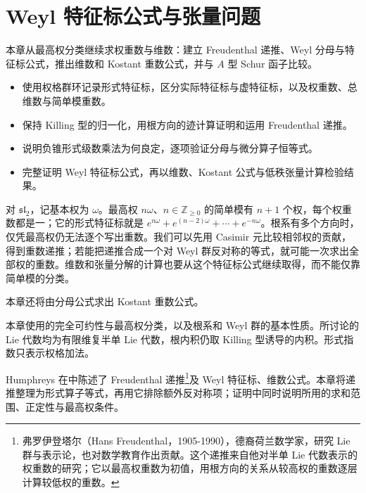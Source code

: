 
\chapter{Weyl 特征标公式与张量问题}
\label{b5:ch:19}

\begin{chapterabstract}
	本章从最高权分类继续求权重数与维数：建立 Freudenthal 递推、Weyl 分母与特征标公式，推出维数和 Kostant 重数公式，并与 \(A\) 型 Schur 函子比较。
\end{chapterabstract}

\begin{learninggoals}
	\begin{itemize}
		\item 使用权格群环记录形式特征标，区分实际特征标与虚特征标，以及权重数、总维数与简单模重数。
		\item 保持 Killing 型的归一化，用根方向的迹计算证明和运用 Freudenthal 递推。
		\item 说明负锥形式级数乘法为何良定，逐项验证分母与微分算子恒等式。
		\item 完整证明 Weyl 特征标公式，再以维数、Kostant 公式与低秩张量计算检验结果。
	\end{itemize}
\end{learninggoals}

对 \(\mathfrak{sl}_2\)，记基本权为 \(\omega\)。最高权 \(n\omega\)、\(n\in\mathbb Z_{\ge0}\) 的简单模有 \(n+1\) 个权，每个权重数都是一；它的形式特征标就是 \(e^{n\omega}+e^{(n-2)\omega}+\cdots+e^{-n\omega}\)。根系有多个方向时，仅凭最高权仍无法逐个写出重数。我们可以先用 Casimir 元比较相邻权的贡献，得到重数递推；若能把递推合成一个对 Weyl 群反对称的等式，就可能一次求出全部权的重数。维数和张量分解的计算也要从这个特征标公式继续取得，而不能仅靠简单模的分类。

本章还将由分母公式求出 Kostant 重数公式。

\ProseParagraphBreak
本章使用的完全可约性与最高权分类，以及根系和 Weyl 群的基本性质。所讨论的 Lie 代数均为有限维复半单 Lie 代数，根内积仍取 Killing 型诱导的内积。形式指数只表示权格加法。

\ProseParagraphBreak
Humphreys 在\cite[Section 22.3, pp. 121--122; Section 24.3, pp. 138--139]{Humphreys1972LieAlgebras}中陈述了 Freudenthal 递推\footnote{弗罗伊登塔尔（Hans Freudenthal，1905-1990），德裔荷兰数学家，研究 Lie 群与表示论，也对数学教育作出贡献。这个递推来自他对半单 Lie 代数表示的权重数的研究；它以最高权重数为初值，用根方向的关系从较高权的重数逐层计算较低权的重数。}及 Weyl 特征标、维数公式。本章将递推整理为形式算子等式，再用它排除额外反对称项；证明中同时说明所用的求和范围、正定性与最高权条件。

